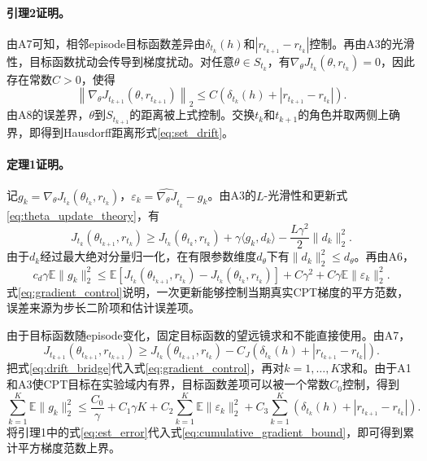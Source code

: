 \paragraph{引理2证明。}
由A7可知，相邻episode目标函数差异由$\delta_{t_k}(h)$和$|r_{t_{k+1}}-r_{t_k}|$控制。再由A3的光滑性，目标函数扰动会传导到梯度扰动。对任意$\theta\in S_{t_k}$，有$\nabla_\theta J_{t_k}(\theta,r_{t_k})=0$，因此存在常数$C>0$，使得
\begin{equation*}
\left\|
\nabla_\theta J_{t_{k+1}}(\theta,r_{t_{k+1}})
\right\|_2
\le
C
\left(
\delta_{t_k}(h)+|r_{t_{k+1}}-r_{t_k}|
\right).
\end{equation*}
由A8的误差界，$\theta$到$S_{t_{k+1}}$的距离被上式控制。交换$t_k$和$t_{k+1}$的角色并取两侧上确界，即得到Hausdorff距离形式\eqref{eq:set_drift}。

\paragraph{定理1证明。}
记$g_k=\nabla_\theta J_{t_k}(\theta_{t_k},r_{t_k})$，$\varepsilon_k=\widehat{\nabla_\theta J}_{t_k}-g_k$。由A3的$L$-光滑性和更新式\eqref{eq:theta_update_theory}，有
\begin{equation}
\label{eq:descent_step}
J_{t_k}(\theta_{t_{k+1}},r_{t_k})
\ge
J_{t_k}(\theta_{t_k},r_{t_k})
+
\gamma\langle g_k,d_k\rangle
-
\frac{L\gamma^2}{2}\|d_k\|_2^2.
\end{equation}
由于$d_k$经过最大绝对分量归一化，在有限参数维度$d_\theta$下有$\|d_k\|_2^2\le d_\theta$。再由A6，
\begin{equation}
\label{eq:gradient_control}
c_d\gamma
\mathbb{E}\|g_k\|_2^2
\le
\mathbb{E}
\left[
J_{t_k}(\theta_{t_{k+1}},r_{t_k})
-
J_{t_k}(\theta_{t_k},r_{t_k})
\right]
+
C\gamma^2
+
C\gamma
\mathbb{E}\|\varepsilon_k\|_2^2.
\end{equation}
式\eqref{eq:gradient_control}说明，一次更新能够控制当期真实CPT梯度的平方范数，误差来源为步长二阶项和估计误差项。

由于目标函数随episode变化，固定目标函数的望远镜求和不能直接使用。由A7，
\begin{equation}
\label{eq:drift_bridge}
J_{t_{k+1}}(\theta_{t_{k+1}},r_{t_{k+1}})
\ge
J_{t_k}(\theta_{t_{k+1}},r_{t_k})
-
C_J
\left(
\delta_{t_k}(h)+|r_{t_{k+1}}-r_{t_k}|
\right).
\end{equation}
把式\eqref{eq:drift_bridge}代入式\eqref{eq:gradient_control}，再对$k=1,\dots,K$求和。由于A1和A3使CPT目标在实验域内有界，目标函数差项可以被一个常数$C_0$控制，得到
\begin{equation}
\label{eq:cumulative_gradient_bound}
\sum_{k=1}^{K}
\mathbb{E}\|g_k\|_2^2
\le
\frac{C_0}{\gamma}
+
C_1\gamma K
+
C_2
\sum_{k=1}^{K}
\mathbb{E}\|\varepsilon_k\|_2^2
+
C_3
\sum_{k=1}^{K}
\left(
\delta_{t_k}(h)+|r_{t_{k+1}}-r_{t_k}|
\right).
\end{equation}
将引理1中的式\eqref{eq:est_error}代入式\eqref{eq:cumulative_gradient_bound}，即可得到累计平方梯度范数上界。

